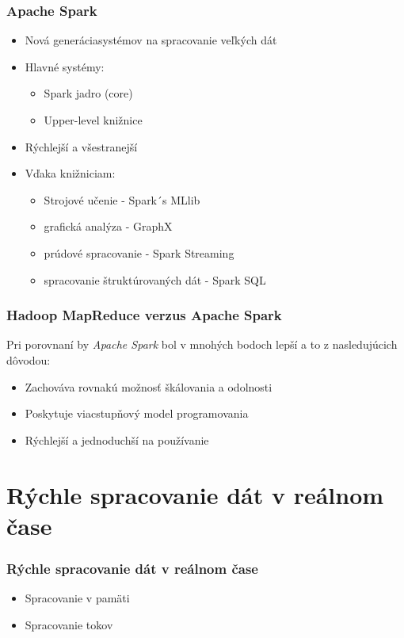 \documentclass{beamer}
\begin{document}
\begin{frame}[fragile=singleslide]\frametitle{Apache Spark}
\begin{itemize}
\item Nová generáciasystémov na spracovanie veľkých dát
\item Hlavné systémy:
	\begin{itemize}
	\item Spark jadro (core)
	\item Upper-level knižnice
	\end{itemize}
\item Rýchlejší a všestranejší
\item Vďaka knižniciam:
	\begin{itemize}
	\item Strojové učenie - Spark´s MLlib
	\item grafická analýza - GraphX
	\item prúdové spracovanie - Spark Streaming
	\item spracovanie štruktúrovaných dát - Spark SQL
	\end{itemize}
\end{itemize}
\end{frame}


\begin{frame}[fragile=singleslide]\frametitle{Hadoop MapReduce verzus Apache Spark}
Pri porovnaní by \emph{Apache Spark} bol v mnohých bodoch lepší a to z nasledujúcich dôvodou:
\begin{itemize}
\item Zachováva rovnakú možnosť škálovania a odolnosti
\item Poskytuje viacstupňový model programovania
\item Rýchlejší a jednoduchší na používanie
\end{itemize}
\end{frame}


\section {Rýchle spracovanie dát v reálnom čase}

\begin{frame}[fragile=singleslide]\frametitle{Rýchle spracovanie dát v reálnom čase}
\begin{itemize}
\item Spracovanie v pamäti
\item Spracovanie tokov
\end{itemize}
\end{frame}
\end{document}

